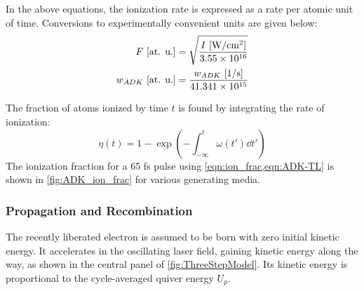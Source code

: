 In the above equations, the ionization rate is expressed as a rate per atomic unit of time. Conversions to experimentally convenient units are given below:
\begin{align}
F \textrm{ [at. u.]} &= \sqrt{\frac{ I \textrm{ [W/cm\textsuperscript{2}]}}{3.55 \times 10^{16}}} \\
w_{ADK} \textrm{  [at. u.]} &= \frac{w_{ADK} \textrm{ [1/s]}}{41.341 \times 10^{15}}
\end{align}

The fraction of atoms ionized by time $t$ is found by integrating the rate of ionization:
\begin{equation}
\eta(t) = 1 - \exp \left( - \int_{-\infty}^{t} \omega(t') \dd{t'} \right)
\label{eqn:ion_frac}
\end{equation}
The ionization fraction for a 65 fs pulse using \cref{eqn:ion_frac,eqn:ADK-TL} is shown in \cref{fig:ADK_ion_frac} for various generating media.

\subsubsection{Propagation and Recombination}


The recently liberated electron is assumed to be born with zero initial kinetic energy. It accelerates in the oscillating laser field, gaining kinetic energy along the way, as shown in the central panel of \cref{fig:ThreeStepModel}. Its kinetic energy is proportional to the cycle-averaged quiver energy $U_p$.

